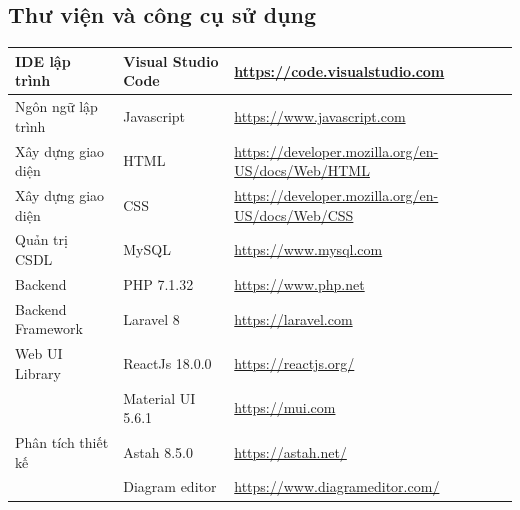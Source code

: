 \documentclass[../DoAn.tex]{subfiles}
\begin{document}
\subsection{Thư viện và công cụ sử dụng}
    \tabletail{\hline}
    \label{bang49}
    \begin{supertabular}{| p{.25\textwidth} | p{.25\textwidth} | p{.40\textwidth} |} 
    \hline
        IDE lập trình& Visual Studio Code& \href{https://code.visualstudio.com}{https://code.visualstudio.com} \\\hline
        Ngôn ngữ lập trình& Javascript& \href{https://www.javascript.com}{https://www.javascript.com} \\\hline
        Xây dựng giao diện& HTML& \href{https://developer.mozilla.org/en-US/docs/Web/HTML}{https://developer.mozilla.org/en-US/docs/Web/HTML} \\\hline
        Xây dựng giao diện& CSS& \href{https://developer.mozilla.org/en-US/docs/Web/CSS}{https://developer.mozilla.org/en-US/docs/Web/CSS} \\\hline
        Quản trị CSDL& MySQL& \href{https://www.mysql.com}{https://www.mysql.com} \\\hline
        Backend& PHP 7.1.32& \href{https://www.php.net}{https://www.php.net}\\\hline
        Backend Framework& Laravel 8& \href{https://laravel.com}{https://laravel.com} \\\hline
        Web UI Library& ReactJs 18.0.0& \href{https://reactjs.org/}{https://reactjs.org/}\\
                      & Material UI 5.6.1&\href{https://mui.com}{https://mui.com} \\\hline
        Phân tích thiết kế& Astah 8.5.0 & \href{https://astah.net/}{https://astah.net/} \\
                          & Diagram editor& \href{https://www.diagrameditor.com/}{https://www.diagrameditor.com/} \\\hline
    \end{supertabular}
\end{document}

